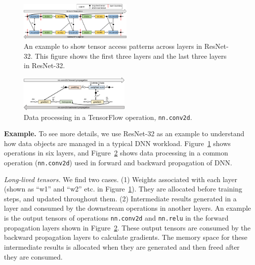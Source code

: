 


\begin{figure}
\centering
\includegraphics[width=0.49\textwidth]{figures/tensor_usage.pdf}
\vspace{-20pt}
\caption{\textcolor{check}{An example to show tensor access patterns across layers in ResNet-32. This figure shows the first three layers and the last three layers in ResNet-32}.}
\vspace{-10pt}
\label{fig:tensor_usage}
\end{figure}
\begin{figure}
\centering
\includegraphics[width=0.48\textwidth]{figures/conv_tensor_usage.pdf}
\vspace{-20pt}
\caption{\textcolor{check}{Data processing in a TensorFlow operation, \texttt{nn.conv2d}.}}
\vspace{-10pt}
\label{fig:conv_tensor_usage}
\end{figure}


\textcolor{check}{
\textbf{Example.} %
\textcolor{check}{To see more details, we use ResNet-32 as an example }
to understand how data objects are managed in a typical DNN workload. Figure~\ref{fig:tensor_usage} shows operations in six layers, and Figure~\ref{fig:conv_tensor_usage} shows data processing in a common operation (\texttt{nn.conv2d}) used in forward and backward propagation of DNN. }

\textcolor{check}{\textit{Long-lived tensors.} We find two cases. (1) Weights associated with each layer (shown as ``w1'' and ``w2'' etc. in Figure~\ref{fig:tensor_usage}). They are allocated before training steps, and updated throughout them.  (2) Intermediate results generated in a layer and consumed by the downstream operations in another layers. An example is the output tensors of operations \texttt{nn.conv2d} and \texttt{nn.relu} in the forward propagation layers shown in Figure~\ref{fig:conv_tensor_usage}. These output tensors are consumed %
\textcolor{check}{by the backward propagation layers to calculate gradients.}
The memory space for these intermediate results is allocated when they are generated and then freed after they are consumed.}


